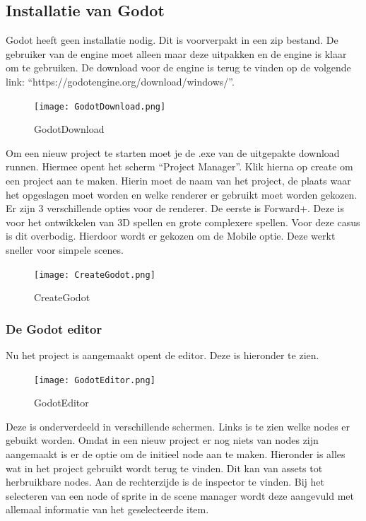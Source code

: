 \subsection{Installatie van Godot}
Godot heeft geen installatie nodig. Dit is voorverpakt in een zip bestand. De gebruiker van de engine moet alleen maar deze uitpakken en de engine is klaar om te gebruiken. De download voor de engine is terug te vinden op de volgende link: “https://godotengine.org/download/windows/”.
\begin{figure}[H]
    \centering
    \texttt{[image: GodotDownload.png]}
    \caption{GodotDownload}
    \label{fig:GodotDownload}
\end{figure}

Om een nieuw project te starten moet je de .exe van de uitgepakte download runnen. Hiermee opent het scherm “Project Manager”. Klik hierna op create om een project aan te maken. Hierin moet de naam van het project, de plaats waar het opgeslagen moet worden en welke renderer er gebruikt moet worden gekozen. Er zijn 3 verschillende opties voor de renderer. De eerste is Forward+. Deze is voor het ontwikkelen van 3D spellen en grote complexere spellen. Voor deze casus is dit overbodig. Hierdoor wordt er gekozen om de Mobile optie. Deze werkt sneller voor simpele scenes.

\begin{figure}[H]
    \centering
    \texttt{[image: CreateGodot.png]}
    \caption{CreateGodot}
    \label{fig:CreateGodot}
\end{figure}

\subsubsection{De Godot editor}
Nu het project is aangemaakt opent de editor. Deze is hieronder te zien.
\begin{figure}[H]
    \centering
    \texttt{[image: GodotEditor.png]}
    \caption{GodotEditor}
    \label{fig:GodotEditor}
\end{figure}
Deze is onderverdeeld in verschillende schermen. Links is te zien welke nodes er gebuikt worden. Omdat in een nieuw project er nog niets van nodes zijn aangemaakt is er de optie om de initieel node aan te maken. Hieronder is alles wat in het project gebruikt wordt terug te vinden. Dit kan van assets tot herbruikbare nodes. Aan de rechterzijde is de inspector te vinden. Bij het selecteren van een node of sprite in de scene manager wordt deze aangevuld met allemaal informatie van het geselecteerde item.

